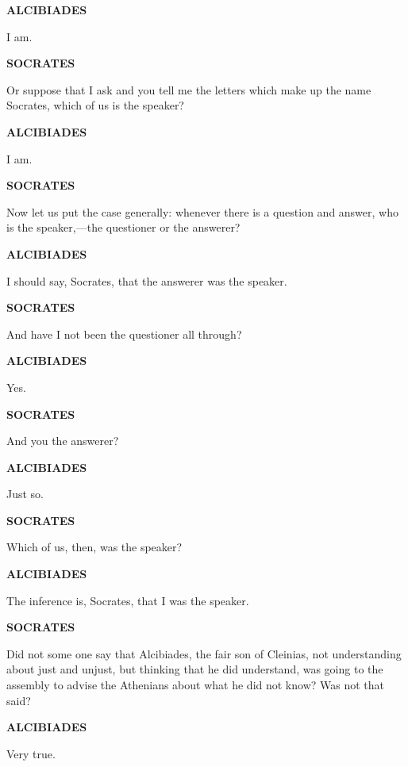\documentclass[11pt,letter]{article}
\begin{document}
\par \textbf{ALCIBIADES}
\par   I am.

\par \textbf{SOCRATES}
\par   Or suppose that I ask and you tell me the letters which make up the name Socrates, which of us is the speaker?

\par \textbf{ALCIBIADES}
\par   I am.

\par \textbf{SOCRATES}
\par   Now let us put the case generally:  whenever there is a question and answer, who is the speaker,—the questioner or the answerer?

\par \textbf{ALCIBIADES}
\par   I should say, Socrates, that the answerer was the speaker.

\par \textbf{SOCRATES}
\par   And have I not been the questioner all through?

\par \textbf{ALCIBIADES}
\par   Yes.

\par \textbf{SOCRATES}
\par   And you the answerer?

\par \textbf{ALCIBIADES}
\par   Just so.

\par \textbf{SOCRATES}
\par   Which of us, then, was the speaker?

\par \textbf{ALCIBIADES}
\par   The inference is, Socrates, that I was the speaker.

\par \textbf{SOCRATES}
\par   Did not some one say that Alcibiades, the fair son of Cleinias, not understanding about just and unjust, but thinking that he did understand, was going to the assembly to advise the Athenians about what he did not know? Was not that said?

\par \textbf{ALCIBIADES}
\par   Very true.
\end{document}
